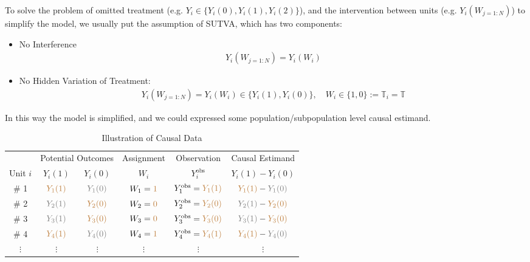     To solve the problem of omitted treatment (e.g. $ Y_i\in\{Y_i(0),Y_i(1),Y_i(2)\} $), and the intervention between units (e.g. $ Y_i(W_{j=1:N}) $) to simplify the model, we usually put the assumption of SUTVA, which has two components:
\begin{itemize}[topsep=2pt,itemsep=0pt]
    \item No Interference
    \begin{align*}
        Y_i(W_{j=1:N})=Y_i(W_i) 
    \end{align*}
    \item No Hidden Variation of Treatment:
    \begin{align*}
        Y_i(W_{j=1:N})=Y_i(W_i)\in\{Y_i(1),Y_i(0)\},\quad W_i\in \{1,0\}:=\mathbb{T}_i=\mathbb{T}
    \end{align*}
\end{itemize}

    In this way the model is simplified, and we could expressed some population/subpopulation level causal estimand.


    \begin{table}[H]
        \centering
        \renewcommand\arraystretch{1}
        \caption{Illustration of Causal Data}
        \begin{tabular}{cccccc}
            \hline
            \hline
            &\multicolumn{2}{c}{Potential Outcomes}&Assignment&Observation&Causal Estimand\\
            \cline{2-3}
            Unit $ i $&$ Y_i(1) $&$ Y_i(0) $&$ W_i $&$ Y^\mathrm{obs}_i  $&$ Y_i(1)-Y_i(0) $\\
            \hline
            \# 1&$ \color{brown}Y_1(1) $&$ \color{gray}Y_1(0) $&$ W_1={\color{brown}1} $&$ Y^\mathrm{obs}_1=\color{brown}Y_1(1)  $&$ {\color{brown}Y_1(1)}-{\color{gray}Y_1(0)} $\\
            \# 2&$ \color{gray}Y_2(1) $&$ \color{brown}Y_2(0) $&$ W_2={\color{brown}0} $&$ Y^\mathrm{obs}_2=\color{brown}Y_2(0)  $&$ {\color{gray}Y_2(1)}-{\color{brown}Y_2(0)} $\\
            \# 3&$ \color{gray}Y_3(1) $&$ \color{brown}Y_3(0) $&$ W_3={\color{brown}0} $&$ Y^\mathrm{obs}_3=\color{brown}Y_3(0)  $&$ {\color{gray}Y_3(1)}-{\color{brown}Y_3(0)} $\\
            \# 4&$ \color{brown}Y_4(1) $&$ \color{gray}Y_4(0) $&$ W_4={\color{brown}1} $&$ Y^\mathrm{obs}_4=\color{brown}Y_4(1)  $&$ {\color{brown}Y_4(1)}-{\color{gray}Y_4(0)} $\\
            $ \vdots $&$ \vdots $&$ \vdots $&$ \vdots $&$ \vdots $&$ \vdots $\\
            \hline
            \hline
        \end{tabular}
        \label{}
    \end{table}
    
